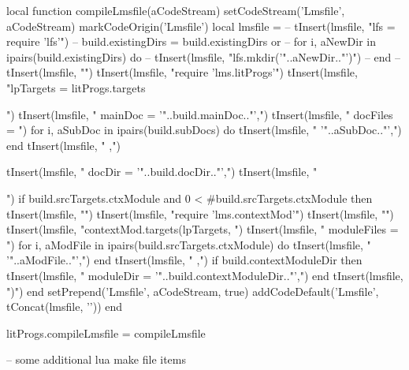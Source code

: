 \startLuaCode
local function compileLmsfile(aCodeStream)
  setCodeStream('Lmsfile', aCodeStream)
  markCodeOrigin('Lmsfile')
  local lmsfile = {}
--  tInsert(lmsfile, "lfs = require 'lfs'\n")
--  build.existingDirs = build.existingDirs or { }
--  for i, aNewDir in ipairs(build.existingDirs) do
--    tInsert(lmsfile, "lfs.mkdir('"..aNewDir.."')")
--  end
--  tInsert(lmsfile, "")
  tInsert(lmsfile, "require 'lms.litProgs'\n")
  tInsert(lmsfile, "lpTargets = litProgs.targets{")
  tInsert(lmsfile, "  mainDoc  = '"..build.mainDoc.."',")
  tInsert(lmsfile, "  docFiles = {")
  for i, aSubDoc in ipairs(build.subDocs) do
    tInsert(lmsfile, "    '"..aSubDoc.."',")
  end
  tInsert(lmsfile, "  },")

  tInsert(lmsfile, "  docDir    = '"..build.docDir.."',")
  tInsert(lmsfile, "}")
  if build.srcTargets.ctxModule and 0 < #build.srcTargets.ctxModule then
    tInsert(lmsfile, "")
    tInsert(lmsfile, "require 'lms.contextMod'")
    tInsert(lmsfile, "")
    tInsert(lmsfile, "contextMod.targets(lpTargets, {")
      tInsert(lmsfile, "  moduleFiles = {")
      for i, aModFile in ipairs(build.srcTargets.ctxModule) do
        tInsert(lmsfile, "    '"..aModFile.."',")
      end
      tInsert(lmsfile, "  },")
      if build.contextModuleDir then
        tInsert(lmsfile, "  moduleDir = '"..build.contextModuleDir.."',")
      end
    tInsert(lmsfile, "})")
  end
  setPrepend('Lmsfile', aCodeStream, true)
  addCodeDefault('Lmsfile', tConcat(lmsfile, '\n'))
end

litProgs.compileLmsfile = compileLmsfile
\stopLuaCode

\startLmsfile
-- some additional lua make file items
\stopLmsfile

\stopchapter
